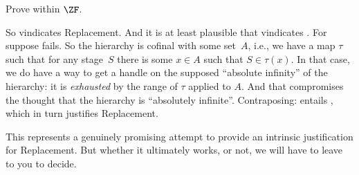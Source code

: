 \documentclass[../../../include/open-logic-section]{subfiles}
\begin{document}
\begin{prob}
Prove \stagescofin{} within $\ZF$.
\end{prob}

So \stagescofin{} vindicates Replacement. And it is at least plausible
that \stagesinex{} vindicates \stagescofin. For suppose \stagescofin{}
fails. So the hierarchy is cofinal with some set~$A$, i.e., we have a
map $\tau$ such that for any stage~$S$ there is some $x \in A$ such
that $S \in \tau(x)$. In that case, we do have a way to get a handle
on the supposed ``absolute infinity'' of the hierarchy: it is
\emph{exhausted} by the range of $\tau$ applied to $A$. And that
compromises the thought that the hierarchy is ``absolutely infinite''.
Contraposing: \stagesinex{} entails \stagescofin, which in turn
justifies Replacement.

This represents a genuinely promising attempt to provide an
intrinsic justification for Replacement. But whether it ultimately
works, or not, we will have to leave to you to decide.
\end{document}
